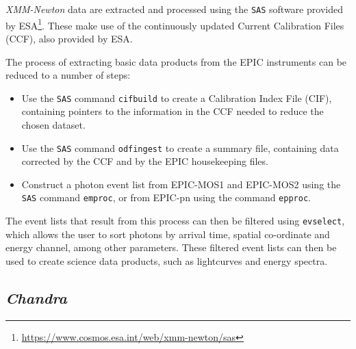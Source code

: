 \par \textit{XMM-Newton} data are extracted and processed using the \texttt{SAS} software \citep{Ibarra_sas} provided by ESA\footnote{\url{https://www.cosmos.esa.int/web/xmm-newton/sas}}.  These make use of the continuously updated Current Calibration Files (CCF), also provided by ESA.
\par The process of extracting basic data products from the EPIC instruments can be reduced to a number of steps:
\begin{itemize}
\item Use the \texttt{SAS} command \texttt{cifbuild} to create a Calibration Index File (CIF), containing pointers to the information in the CCF needed to reduce the chosen dataset.
\item Use the \texttt{SAS} command \texttt{odfingest} to create a summary file, containing data corrected by the CCF and by the EPIC housekeeping files.
\item Construct a photon event list from EPIC-MOS1 and EPIC-MOS2 using the \texttt{SAS} command \texttt{emproc}, or from EPIC-pn using the command \texttt{epproc}.
\end{itemize}
The event lists that result from this process can then be filtered using \texttt{evselect}, which allows the user to sort photons by arrival time, spatial co-ordinate and energy channel, among other parameters.  These filtered event lists can then be used to create science data products, such as lightcurves and energy spectra.

\subsection{\textit{Chandra}}

